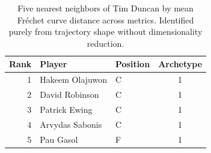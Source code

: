 \begin{table}[htbp]
  \centering\small
  \begin{tabular}{rllc}
    \toprule
    Rank & Player & Position & Archetype \\
    \midrule
    1 & Hakeem Olajuwon & C & 1 \\
    2 & David Robinson & C & 1 \\
    3 & Patrick Ewing & C & 1 \\
    4 & Arvydas Sabonis & C & 1 \\
    5 & Pau Gasol & F & 1 \\
    \bottomrule
  \end{tabular}
  \caption{Five nearest neighbors of Tim Duncan by mean Fr\'{e}chet curve distance across metrics. Identified purely from trajectory shape without dimensionality reduction.}
  \label{tab:Tim_Duncan_frechet_curve_neighbors}
\end{table}

